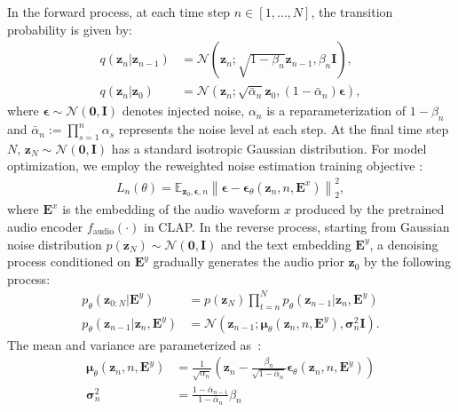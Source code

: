 In the forward process, at each time step $n\in [1,\dots,N]$, the transition probability is given by:
\begin{align}
q(\boldsymbol{z}_{n}|\boldsymbol{z}_{n-1})&=\mathcal{N}(\boldsymbol{z}_{n};\sqrt{1-\beta_{n}}\boldsymbol{z}_{n-1},\beta_{n}\boldsymbol{I}), \\
\label{forwardprocess}
q(\boldsymbol{z}_{n}|\boldsymbol{z}_{0})&=\mathcal  N(\boldsymbol{z}_{n};\sqrt{\bar{\alpha}_{n}}\boldsymbol{z}_{0},(1-\bar{\alpha}_{n})\boldsymbol{\epsilon}),
\end{align} 
where $\boldsymbol{\epsilon}\sim\mathcal N(\boldsymbol{0},\boldsymbol{I})$ denotes injected noise, $\alpha_{n}$ is a reparameterization of $1-\beta_{n}$ and $\bar{\alpha}_{n}:=\prod_{s=1}^{n}\alpha_{s}$ represents the noise level at each step. 
At the final time step $N$, $\boldsymbol{z}_{N}\sim\mathcal N(\boldsymbol{0},\boldsymbol{I})$ has a standard isotropic Gaussian distribution.
For model optimization, we employ the reweighted noise estimation training objective \cite{DDPM,DiffWave,rombach2022high}:
\begin{align}
\label{trainingobjective}
L_{n}(\theta)=\mathbb{E}_{\boldsymbol{z}_{0},\boldsymbol{\epsilon},n}\left \| \boldsymbol{\epsilon} - \boldsymbol{\epsilon}_{\theta}(\boldsymbol{z}_{n},n,\boldsymbol{E}^{x}) \right\|^2_{2},
\end{align}
where $\boldsymbol{E}^{x}$ is the embedding of the audio waveform $x$ produced by the pretrained audio encoder $f_{\text{audio}}(\cdot)$ in CLAP. In the reverse process, starting from Gaussian noise distribution $p(\boldsymbol{z}_{N})\sim\mathcal N(\boldsymbol{0},\boldsymbol{I})$ and the text embedding $\boldsymbol{E}^{y}$, a denoising process conditioned on $\boldsymbol{E}^{y}$ gradually generates the audio prior $\boldsymbol{z}_{0}$ by the following process:
\begin{align}
p_{\theta}(\boldsymbol{z}_{0:N}|\boldsymbol{E}^{y})&=p(\boldsymbol{z}_{N})\prod_{t=n}^{N}p_{\theta}(\boldsymbol{z}_{n-1}|\boldsymbol{z}_{n},\boldsymbol{E}^{y}) \\
\label{singlereversestep}
p_{\theta}(\boldsymbol{z}_{n-1}|\boldsymbol{z}_{n},\boldsymbol{E}^{y})&=\mathcal{N}(\boldsymbol{z}_{n-1};\boldsymbol{\mu}_{\theta}(\boldsymbol{z}_{n},n,\boldsymbol{E}^{y}),\boldsymbol{\sigma}_{n}^{2}\boldsymbol{I}).
\end{align}
The mean and variance are parameterized as~\cite{DDPM}: 
\begin{align}
\boldsymbol{\mu}_{\theta}(\boldsymbol{z}_{n},n,\boldsymbol{E}^{y})&=\frac{1}{\sqrt{\alpha_{n}}}(\boldsymbol{z}_{n}-\frac{\beta_{n}}{\sqrt{1-\bar{\alpha}_{n}}}\boldsymbol{\epsilon}_{\theta}(\boldsymbol{z}_{n},n,\boldsymbol{E}^{y})) \\
\boldsymbol{\sigma}_{n}^{2}&=\frac{1-\bar{\alpha}_{n-1}}{1-\bar{\alpha}_{n}}\beta_{n}
\end{align}

